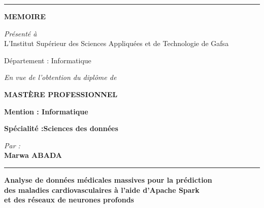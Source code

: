 \documentclass[12pt,a4paper]{report}
\begin{document}
\begin{titlepage}
\begin{center}
\color{blue}
\rule{\textwidth}{1pt}
\color{black}

\vspace{0.2cm}

{\fontsize{22}{24}\selectfont \textbf{MEMOIRE}}

\vspace{0.3cm}

\small
\textit{Présenté à}\\[0.15cm]
L’Institut Supérieur des Sciences Appliquées et de Technologie de Gafsa

\vspace{0.3cm}

Département : Informatique 

\vspace{0.3cm}

\textit{En vue de l’obtention du diplôme de}

\vspace{0.3cm}

{\Large \textbf{MASTÈRE PROFESSIONNEL}}
\vspace{0.3cm}
\begin{flushleft}
\hspace{2cm}\textbf{Mention : Informatique} 
\end{flushleft}

\vspace{-0.1cm}

\begin{flushleft}
\hspace{2cm}\textbf{Spécialité :Sciences des données} 
\end{flushleft}

\vspace{0.2cm}

\textit{Par :}\\[0.1cm]
{\large \textbf{Marwa ABADA}}

\vspace{0.2cm}

\rule{7cm}{0.8pt}

\vspace{0.2cm}

{\normalsize \bfseries
Analyse de données médicales massives pour la prédiction\\[0.15cm]
des maladies cardiovasculaires à l’aide d’Apache Spark\\[0.15cm]
et des réseaux de neurones profonds
}

\vspace{0.2cm}


\end{center}
\end{titlepage}
\end{document}
